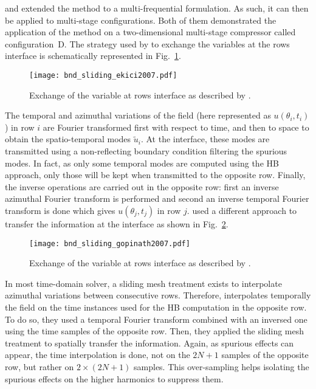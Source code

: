 \citet{Ekici2007} and \citet{Gopinath2007}
extended the method to a multi-frequential formulation. 
As such, it can then be applied to multi-stage
configurations. Both of them demonstrated the application of
the method on
a two-dimensional multi-stage compressor called
configuration~D. 
The strategy used by \citet{Ekici2007} 
to exchange the variables at
the rows interface is schematically represented 
in Fig.~\ref{fig:bnd_sliding_ekici2007}.
\begin{figure}[htp]
  \centering
  \texttt{[image: bnd\_sliding\_ekici2007.pdf]}
  \caption{Exchange of the variable at rows interface as described by \citet{Ekici2007}.}
  \label{fig:bnd_sliding_ekici2007}
\end{figure}
The temporal and azimuthal variations 
of the field (here represented as $u (\theta_i, t_i)$)
in row $i$ are Fourier transformed first with
respect to time, and then
to space to obtain the spatio-temporal modes $\widetilde{u}_i$.
At the interface, these modes are transmitted using a non-reflecting
boundary condition filtering the spurious modes. In fact, as only some
temporal modes are computed using the HB approach, only
those will be kept when transmitted to the opposite row.
Finally, the inverse operations are carried out in
the opposite row: first an inverse
azimuthal Fourier transform is performed and second an inverse
temporal Fourier transform is done which gives $u (\theta_j, t_j)$
in row $j$.
\citet{Gopinath2007} used a different approach to transfer
the information at the interface as shown
in Fig.~\ref{fig:bnd_sliding_gopinath2007}. 
\begin{figure}[htp]
  \centering
  \texttt{[image: bnd\_sliding\_gopinath2007.pdf]}
  \caption{Exchange of the variable at rows interface as described by \citet{Gopinath2007}.}
  \label{fig:bnd_sliding_gopinath2007}
\end{figure}
In most time-domain solver,
a sliding mesh treatment exists to interpolate azimuthal variations
between consecutive rows. Therefore, \citet{Gopinath2007}
interpolates temporally the field on the time instances used for
the HB computation in
the opposite row. To do so, they used a temporal Fourier
transform combined with an inversed one using the time samples
of the opposite row.
Then, they applied the sliding mesh treatment
to spatially transfer the information. Again, as spurious effects
can appear, the time interpolation is done, not on the $2N+1$ samples
of the opposite row, but rather on $2 \times (2N+1)$ samples. This over-sampling
helps isolating the spurious effects on the higher harmonics to suppress them.


